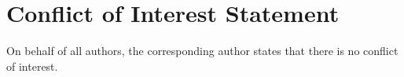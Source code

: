 \documentclass[preprint,12pt]{elsarticle}
\begin{document}
\section*{Conflict of Interest Statement}
On behalf of all authors, the corresponding author states that there is no conflict of interest.









\end{document}
